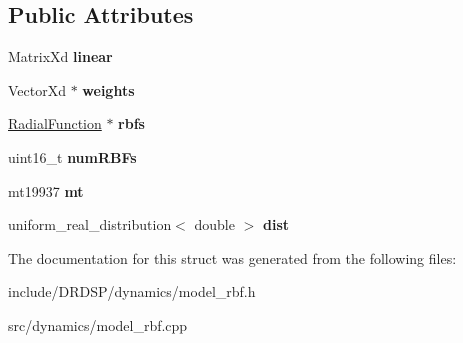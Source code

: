 \subsection*{Public Attributes}
\begin{DoxyCompactItemize}
\item 
\hypertarget{struct_d_r_d_s_p_1_1_model_r_b_f_a295c1bdd680acbc4dce1ae1b7ae2743d}{Matrix\-Xd {\bfseries linear}}\label{struct_d_r_d_s_p_1_1_model_r_b_f_a295c1bdd680acbc4dce1ae1b7ae2743d}

\item 
\hypertarget{struct_d_r_d_s_p_1_1_model_r_b_f_af487cf67bfa20fac1153f115526cd637}{Vector\-Xd $\ast$ {\bfseries weights}}\label{struct_d_r_d_s_p_1_1_model_r_b_f_af487cf67bfa20fac1153f115526cd637}

\item 
\hypertarget{struct_d_r_d_s_p_1_1_model_r_b_f_a8022160fcd8b300a8dac26aaba154c55}{\hyperlink{struct_d_r_d_s_p_1_1_radial_function}{Radial\-Function} $\ast$ {\bfseries rbfs}}\label{struct_d_r_d_s_p_1_1_model_r_b_f_a8022160fcd8b300a8dac26aaba154c55}

\item 
\hypertarget{struct_d_r_d_s_p_1_1_model_r_b_f_aabf99925c656c768e46f1ddd5096f2d5}{uint16\-\_\-t {\bfseries num\-R\-B\-Fs}}\label{struct_d_r_d_s_p_1_1_model_r_b_f_aabf99925c656c768e46f1ddd5096f2d5}

\item 
\hypertarget{struct_d_r_d_s_p_1_1_model_r_b_f_a50c0bfe964e3d4e0471d243df45339ac}{mt19937 {\bfseries mt}}\label{struct_d_r_d_s_p_1_1_model_r_b_f_a50c0bfe964e3d4e0471d243df45339ac}

\item 
\hypertarget{struct_d_r_d_s_p_1_1_model_r_b_f_a98593874be4ffe6191cec267cefa773d}{uniform\-\_\-real\-\_\-distribution$<$ double $>$ {\bfseries dist}}\label{struct_d_r_d_s_p_1_1_model_r_b_f_a98593874be4ffe6191cec267cefa773d}

\end{DoxyCompactItemize}


The documentation for this struct was generated from the following files\-:\begin{DoxyCompactItemize}
\item 
include/\-D\-R\-D\-S\-P/dynamics/model\-\_\-rbf.\-h\item 
src/dynamics/model\-\_\-rbf.\-cpp\end{DoxyCompactItemize}
